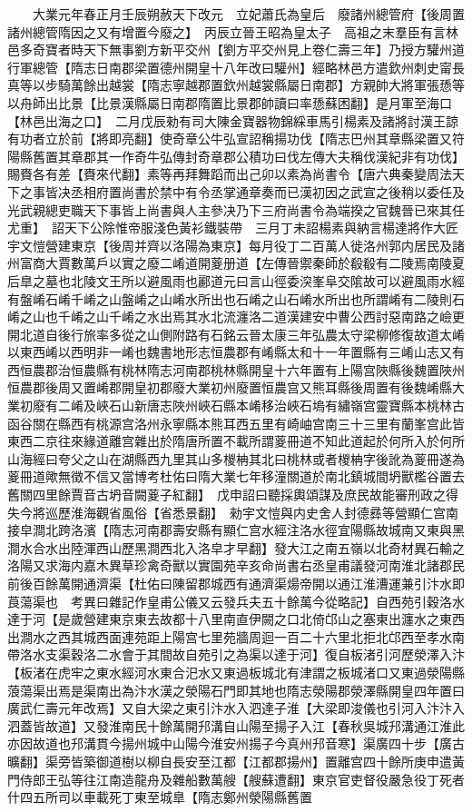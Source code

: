 　　大業元年春正月壬辰朔赦天下改元　立妃蕭氏為皇后　廢諸州總管府【後周置諸州總管隋因之又有增置今廢之】　丙辰立晉王昭為皇太子　高祖之末羣臣有言林邑多奇寶者時天下無事劉方新平交州【劉方平交州見上卷仁壽三年】乃授方驩州道行軍總管【隋志日南郡梁置德州開皇十八年改曰驩州】經略林邑方遣欽州刺史甯長真等以步騎萬餘出越裳【隋志寧越郡置欽州越裳縣屬日南郡】方親帥大將軍張愻等以舟師出比景【比景漢縣屬日南郡隋置比景郡帥讀曰率愻蘇困翻】是月軍至海口【林邑出海之口】　二月戊辰勑有司大陳金寶器物錦綵車馬引楊素及諸將討漢王諒有功者立於前【將即亮翻】使奇章公牛弘宣詔稱揚功伐【隋志巴州其章縣梁置又符陽縣舊置其章郡其一作奇牛弘傳封奇章郡公積功曰伐左傳大夫稱伐漢紀非有功伐】賜賚各有差【賚來代翻】素等再拜舞蹈而出己卯以素為尚書令【唐六典秦變周法天下之事皆决丞相府置尚書於禁中有令丞掌通章奏而已漢初因之武宣之後稍以委任及光武親總吏職天下事皆上尚書與人主參决乃下三府尚書令為端揆之官魏晉已來其任尤重】　詔天下公除惟帝服淺色黃衫鐵裝帶　三月丁未詔楊素與納言楊達將作大匠宇文愷營建東京【後周并齊以洛陽為東京】每月役丁二百萬人徙洛州郭内居民及諸州富商大賈數萬戶以實之廢二崤道開葼册道【左傳晉禦秦師於殽殽有二陵焉南陵夏后臯之墓也北陵文王所以避風雨也酈道元曰言山徑委湥峯阜交隂故可以避風雨水經有盤崤石崤千崤之山盤崤之山崤水所出也石崤之山石崤水所出也所謂崤有二陵則石崤之山也千崤之山千崤之水出焉其水北流瀍洛二道漢建安中曹公西討惡南路之嶮更開北道自後行旅率多從之山側附路有石銘云晉太康三年弘農太守梁柳修復故道太崤以東西崤以西明非一崤也魏書地形志恒農郡有崤縣太和十一年置縣有三崤山志又有西恒農郡治恒農縣有桃林隋志河南郡桃林縣開皇十六年置有上陽宫陜縣後魏置陜州恒農郡後周又置崤郡開皇初郡廢大業初州廢置恒農宫又熊耳縣後周置有後魏崤縣大業初廢有二崤及峽石山新唐志陜州峽石縣本崤移治峽石塢有繡嶺宫靈寶縣本桃林古函谷關在縣西有桃源宫洛州永寧縣本熊耳西五里有崎岫宫南三十三里有蘭峯宫此皆東西二京往來緣道離宫雜出於隋唐所置不載所謂葼冊道不知此道起於何所入於何所山海經曰夸父之山在湖縣西九里其山多椶柟其北曰桃林或者椶柟字後訛為葼冊遂為葼冊道歟無徵不信又當博考杜佑曰隋大業七年移潼關道於南北鎮城間坍獸檻谷置去舊關四里餘賈音古坍音闕葼子紅翻】　戊申詔曰聽採輿頌謀及庶民故能審刑政之得失今將巡歷淮海觀省風俗【省悉景翻】　勑宇文愷與内史舍人封德彞等營顯仁宫南接皁澗北跨洛濱【隋志河南郡壽安縣有顯仁宫水經注洛水徑宜陽縣故城南又東與黑澗水合水出陸渾西山歷黑澗西北入洛皁才早翻】發大江之南五嶺以北奇材異石輸之洛陽又求海内嘉木異草珍禽奇獸以實園苑辛亥命尚書右丞皇甫議發河南淮北諸郡民前後百餘萬開通濟渠【杜佑曰陳留郡城西有通濟渠煬帝開以通江淮漕運兼引汴水即莨蕩渠也　考異曰雜記作皇甫公儀又云發兵夫五十餘萬今從略記】自西苑引穀洛水達于河【是歲營建東京東去故都十八里南直伊闕之口北倚邙山之塞東出瀍水之東西出澗水之西其城西面連苑距上陽宫七里苑牆周迴一百二十六里北拒北邙西至孝水南帶洛水支渠穀洛二水會于其間故自苑引之為渠以達于河】復自板渚引河歷滎澤入汴【板渚在虎牢之東水經河水東合汜水又東過板城北有津謂之板城渚口又東過滎陽縣蒗蕩渠出焉是渠南出為汴水漢之滎陽石門即其地也隋志滎陽郡滎澤縣開皇四年置曰廣武仁壽元年改焉】又自大梁之東引汴水入泗達子淮【大梁即浚儀也引河入汴汴入泗蓋皆故道】又發淮南民十餘萬開䢴溝自山陽至揚子入江【春秋吳城䢴溝通江淮此亦因故道也䢴溝貫今揚州城中山陽今淮安州揚子今真州䢴音寒】渠廣四十步【廣古曠翻】渠旁皆築御道樹以柳自長安至江都【江都郡揚州】置離宫四十餘所庚申遣黃門侍郎王弘等往江南造龍舟及雜船數萬艘【艘蘇遭翻】東京官吏督役嚴急役丁死者什四五所司以車載死丁東至城臯【隋志鄭州滎陽縣舊置